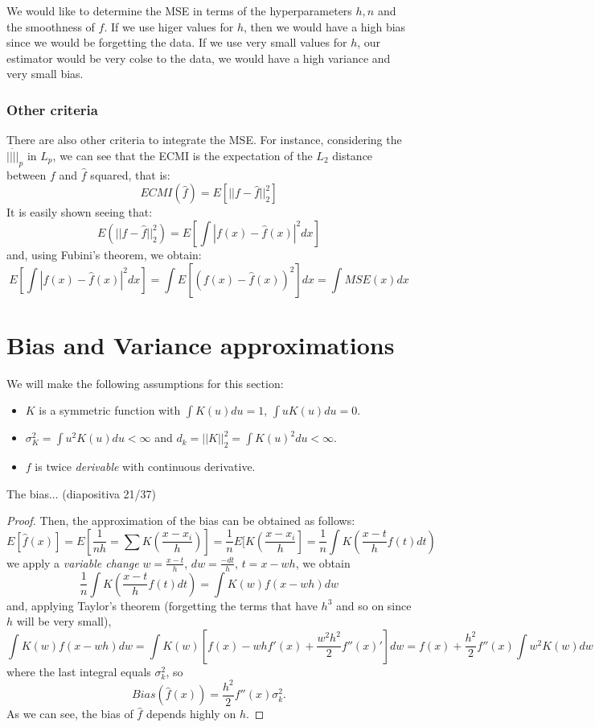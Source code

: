 We would like to determine the MSE in terms of the hyperparameters $h,n$ and the smoothness of $f$. If we use higer values for $h$, then we would have a high bias since we would be forgetting the data. If we use very small values for $h$, our estimator would be very colse to the data, we would have a high variance and very small bias. 

\subsubsection{ Other criteria}

There are also other criteria to integrate the MSE. For instance, considering the $||\dot||_p$ in $L_p$, we can see that the ECMI is the expectation of the $L_2$ distance between $f$ and $\hat f$ squared, that is:
\[
ECMI(\hat f) = E[||f-\hat f||_2^2]
\]
It is easily shown seeing that:
\[
E(||f-\hat f||^2_2) = E[ \int |f(x) - \hat f(x)|^2 dx]
\]
and, using Fubini's theorem, we obtain:
\[
E[ \int |f(x) - \hat f(x)|^2 dx] = \int E[(f(x) - \hat f(x))^2] dx = \int MSE(x) dx
\]

\section{ Bias and Variance approximations}

We will make the following assumptions for this section:
\begin{itemize}
\item $K$ is a symmetric function with $\int K(u)du = 1$, $\int uK(u)du = 0$.
\item $\sigma_K^2 = \int u^2 K(u) du < \infty$ and $d_k = ||K||_2^2 = \int K(u)^2 du < \infty$.
\item $f$ is twice \emph{derivable} with continuous derivative.
\end{itemize}

\begin{nprop}
The bias... (diapositiva 21/37)
\end{nprop}
\begin{proof}

Then, the approximation of the bias can be obtained as follows:
\[
E[\hat f(x)] = E \left[ \frac{1}{nh} = \sum K \left( \frac{x-x_i}{h}\right)\right] = \frac{1}{n} E[K \left( \frac{x-x_i}{h}\right] = \frac{1}{n}\int K \left( \frac{x-t}{h} f(t) dt\right)
\]
we apply a \emph{variable change} \(w = \frac{x-t}{h}\), \(dw = \frac{-dt}{h}\), \(t = x -wh\), we obtain
\[
 \frac{1}{n}\int K \left( \frac{x-t}{h} f(t) dt\right) = \int K(w) f(x-wh) dw
\]
and, applying Taylor's theorem (forgetting the terms that have $h^3$ and so on since $h$ will be very small),
\[
\int K(w) f(x-wh) dw = \int K(w)\left[ f(x) - whf'(x) + \frac{w^2 h^2}{2}f''(x)'\right]dw = f(x) + \frac{h^2}{2}f''(x) \int w^2 K(w) dw
\]
where the last integral equals $\sigma_k^2$, so
\[
Bias(\hat f(x)) = \frac{h^2}{2}f''(x) \sigma_k^2.
\]
As we can see, the bias of $\hat f$ depends highly on $h$.

\end{proof}

